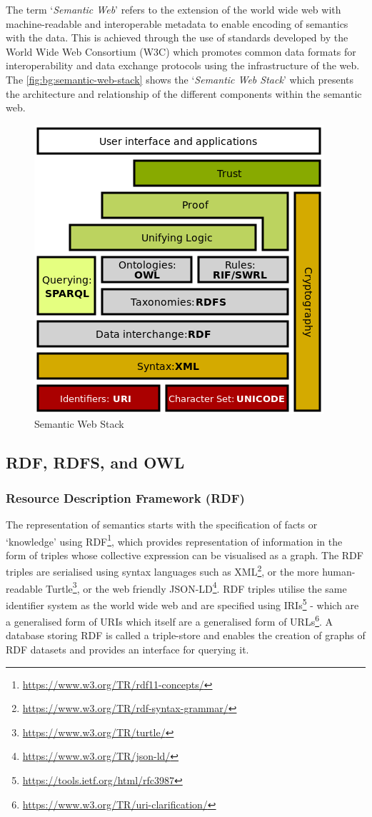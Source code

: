 The term `\textit{Semantic Web}' refers to the extension of the world wide web with machine-readable and interoperable metadata to enable encoding of semantics with the data.
This is achieved through the use of standards developed by the World Wide Web Consortium (W3C) which promotes common data formats for interoperability and data exchange protocols using the infrastructure of the web.
The \autoref{fig:bg:semantic-web-stack} shows the `\textit{Semantic Web Stack}' which presents the architecture and relationship of the different components within the semantic web.
\begin{figure}[htbp]
    \centering
    \includegraphics[width=0.75\linewidth]{img/Semantic_web_stack.png}
    \caption{Semantic Web Stack}
    \label{fig:bg:semantic-web-stack}
\end{figure}

\subsection{RDF, RDFS, and OWL}

\subsubsection{Resource Description Framework (RDF)}
The representation of semantics starts with the specification of facts or `knowledge' using RDF\footnote{\url{https://www.w3.org/TR/rdf11-concepts/}}, which provides representation of information in the form of triples whose collective expression can be visualised as a graph.
The RDF triples are serialised using syntax languages such as XML\footnote{\url{https://www.w3.org/TR/rdf-syntax-grammar/}}, or the more human-readable Turtle\footnote{\url{https://www.w3.org/TR/turtle/}}, or the web friendly JSON-LD\footnote{\url{https://www.w3.org/TR/json-ld/}}.
RDF triples utilise the same identifier system as the world wide web and are specified using IRIs\footnote{\url{https://tools.ietf.org/html/rfc3987}} - which are a generalised form of URIs which itself are a generalised form of URLs\footnote{\url{https://www.w3.org/TR/uri-clarification/}}.
A database storing RDF is called a triple-store and enables the creation of graphs of RDF datasets and provides an interface for querying it.

